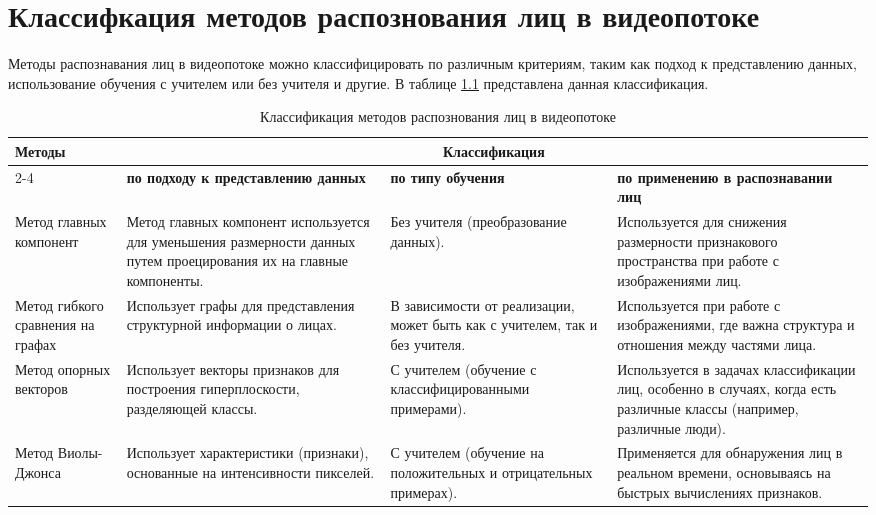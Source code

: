 \chapter{Классифкация методов распознования лиц в видеопотоке}

Методы распознавания лиц в видеопотоке можно классифицировать по различным критериям, таким как подход к представлению данных, использование обучения с учителем или без учителя и другие. В таблице \ref{tab:table} представлена данная классификация.

\begin{table}[h]
    \centering
    \small
    \caption{\label{tab:table} Классификация методов распознования лиц в видеопотоке}
    \begin{tabular}{|p{3cm}|p{4.5cm}|p{4cm}|p{4cm}|}
        \hline
        \multirow{4}{*}{\textbf{Методы}} & \multicolumn{3}{c|}{\textbf{Классификация}} \\
        \cline{2-4}
        & \textbf{по подходу к представлению данных} & \textbf{по типу обучения} & \textbf{по применению в распознавании лиц} \\
        \hline
        Метод главных компонент & Метод главных компонент используется для уменьшения размерности данных путем проецирования их на главные компоненты. & Без учителя (преобразование данных). & Используется для снижения размерности признакового пространства при работе с изображениями лиц. \\
        \hline
        Метод гибкого сравнения на графах & Использует графы для представления структурной информации о лицах. & В зависимости от реализации, может быть как с учителем, так и без учителя. & Используется при работе с изображениями, где важна структура и отношения между частями лица. \\
        \hline
        Метод опорных векторов & Использует векторы признаков для построения гиперплоскости, разделяющей классы. & С учителем (обучение с классифицированными примерами). & Используется в задачах классификации лиц, особенно в случаях, когда есть различные классы (например, различные люди). \\
        \hline
        Метод Виолы-Джонса & Использует характеристики (признаки), основанные на интенсивности пикселей. & С учителем (обучение на положительных и отрицательных примерах). & Применяется для обнаружения лиц в реальном времени, основываясь на быстрых вычислениях признаков. \\
        \hline
    \end{tabular}
\end{table}
